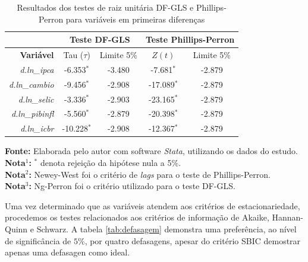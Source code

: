 \documentclass[12pt,oneside,a4paper,chapter=TITLE,english,brazil,sumario=abnt-6027-2012]{abntex2}
\begin{document}
\begin{table}[H]
\centering
\caption{Resultados dos testes de raiz unitária DF-GLS e Phillips-Perron para variáveis em primeiras diferenças}
\label{table:adfpptestsdiff}
\renewcommand{\arraystretch}{1.1}
\begin{tabular}{rcc|cc}
\hline
 & \multicolumn{2}{c|}{\textbf{Teste DF-GLS}} 
 & \multicolumn{2}{c}{\textbf{Teste Phillips-Perron}} \\
\hline
\textbf{Variável}    & Tau ($\tau$)  & Limite 5\% & $Z(t)$ & Limite 5\% \\ 
\textit{d.ln\_ipca}    & -6.353$^*$  & -3.480     & -7.681$^*$  & -2.879     \\
\textit{d.ln\_cambio}  & -9.456$^*$  & -2.908     & -17.089$^*$ & -2.879     \\
\textit{d.ln\_selic}   & -3.336$^*$  & -2.903     & -23.165$^*$ & -2.879     \\
\textit{d.ln\_pibinfl} & -5.560$^*$  & -2.879     & -20.398$^*$ & -2.879     \\
\textit{d.ln\_icbr}    & -10.228$^*$ & -2.908     & -12.367$^*$ & -2.879     \\
\hline
\end{tabular}
\vspace{1ex}
\begin{minipage}{0.9\linewidth}
\footnotesize
\textbf{Fonte:} Elaborada pelo autor com software \textit{Stata}, utilizando os dados do estudo.\\
\textbf{Nota$^1$:} $^*$ denota rejeição da hipótese nula a 5\%.\\
\textbf{Nota$^2$:} Newey-West foi o critério de \textit{lags} para o teste de Phillips-Perron.\\
\textbf{Nota$^3$:} Ng-Perron foi o critério utilizado para o teste DF-GLS.
\end{minipage}
\end{table}

Uma vez determinado que as variáveis atendem aos critérios de estacionariedade, procedemos os testes relacionados aos critérios de informação de Akaike, Hannan-Quinn e Schwarz. A tabela \ref{tab:defasagem} demonstra uma preferência, ao nível de significância de $5\%$, por quatro defasagens, apesar do critério SBIC demostrar apenas uma defasagen como ideal.
\end{document}
